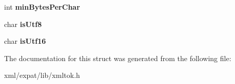 \begin{DoxyCompactItemize}
\item 
\hypertarget{structencoding_a8eb3388eddb82277ff63c992153f3595}{int {\bfseries min\-Bytes\-Per\-Char}}\label{structencoding_a8eb3388eddb82277ff63c992153f3595}

\item 
\hypertarget{structencoding_a0d05507753831ee4427cd797668957bc}{char {\bfseries is\-Utf8}}\label{structencoding_a0d05507753831ee4427cd797668957bc}

\item 
\hypertarget{structencoding_a6990f83527cc7262bb17809aab156a9e}{char {\bfseries is\-Utf16}}\label{structencoding_a6990f83527cc7262bb17809aab156a9e}

\end{DoxyCompactItemize}


The documentation for this struct was generated from the following file\-:\begin{DoxyCompactItemize}
\item 
xml/expat/lib/xmltok.\-h\end{DoxyCompactItemize}
